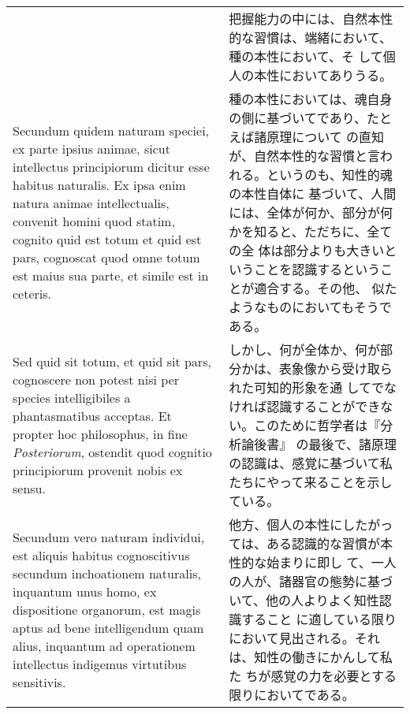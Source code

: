 \documentclass[10pt]{jsarticle} %
\begin{document}
\begin{longtable}{p{21em}p{21em}}
&

把握能力の中には、自然本性的な習慣は、端緒において、種の本性において、そ
して個人の本性においてありうる。

\\


Secundum quidem naturam speciei, ex parte ipsius animae, sicut
intellectus principiorum dicitur esse habitus naturalis. Ex ipsa enim
natura animae intellectualis, convenit homini quod statim, cognito
quid est totum et quid est pars, cognoscat quod omne totum est maius
sua parte, et simile est in ceteris.

&

種の本性においては、魂自身の側に基づいてであり、たとえば諸原理について
の直知が、自然本性的な習慣と言われる。というのも、知性的魂の本性自体に
基づいて、人間には、全体が何か、部分が何かを知ると、ただちに、全ての全
体は部分よりも大きいということを認識するということが適合する。その他、
似たようなものにおいてもそうである。


\\



Sed quid sit totum, et quid sit pars, cognoscere non potest nisi per
species intelligibiles a phantasmatibus acceptas. Et propter hoc
philosophus, in fine {\itshape Posteriorum}, ostendit quod cognitio principiorum
provenit nobis ex sensu.

&

しかし、何が全体か、何が部分かは、表象像から受け取られた可知的形象を通
 してでなければ認識することができない。このために哲学者は『分析論後書』
 の最後で、諸原理の認識は、感覚に基づいて私たちにやって来ることを示し
 ている。

\\



Secundum vero naturam individui, est aliquis habitus cognoscitivus
secundum inchoationem naturalis, inquantum unus homo, ex dispositione
organorum, est magis aptus ad bene intelligendum quam alius, inquantum
ad operationem intellectus indigemus virtutibus sensitivis.

&

他方、個人の本性にしたがっては、ある認識的な習慣が本性的な始まりに即し
て、一人の人が、諸器官の態勢に基づいて、他の人よりよく知性認識すること
 に適している限りにおいて見出される。それは、知性の働きにかんして私た
 ちが感覚の力を必要とする限りにおいてである。

\\




\end{longtable}
\end{document}
